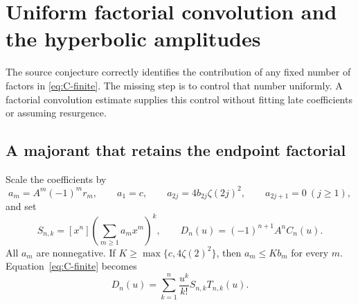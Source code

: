 \section{Uniform factorial convolution and the hyperbolic amplitudes}
\label{sec:leading}

The source conjecture correctly identifies the contribution of any fixed
number of factors in \eqref{eq:C-finite}. The missing step is to control
that number uniformly. A factorial convolution estimate supplies this
control without fitting late coefficients or assuming resurgence.

\subsection{A majorant that retains the endpoint factorial}

Scale the coefficients by
\begin{equation}\label{eq:positive-scaled}
 a_m=A^m(-1)^mr_m,\qquad a_1=c,\qquad
 a_{2j}=4b_{2j}\zeta(2j)^2,\qquad a_{2j+1}=0\ (j\ge1),
\end{equation}
and set
\begin{equation}\label{eq:S-D}
 S_{n,k}=[x^n]\left(\sum_{m\ge1}a_mx^m\right)^k,
 \qquad D_n(u)=(-1)^{n+1}A^nC_n(u).
\end{equation}
All $a_m$ are nonnegative. If
$K\ge\max\{c,4\zeta(2)^2\}$, then $a_m\le Kb_m$ for every $m$.
Equation~\eqref{eq:C-finite} becomes
\begin{equation}\label{eq:D-formula}
 D_n(u)=\sum_{k=1}^n\frac{u^k}{k!}S_{n,k}T_{n,k}(u).
\end{equation}


